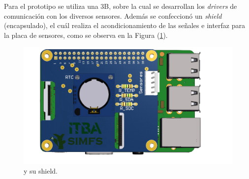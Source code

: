 
\Subsubsection{\rspi}
Para el prototipo se utiliza una \rspi 3B, sobre la cual se desarrollan los \textit{drivers} de comunicación con los diversos sensores. Además se confeccionó un \textit{shield} (encapsulado), el cuál realiza el acondicionamiento de las señales e interfaz para la placa de sensores, como se observa en la Figura (\ref{fig:shield}).

\begin{figure}[H]
	\centering	\includegraphics[width=0.6\linewidth,page=1]{ImagenesConstruccion del prototipo/shieldSensor}		
	\caption{\rspi y su shield.}
	\label{fig:shield}
\end{figure}

